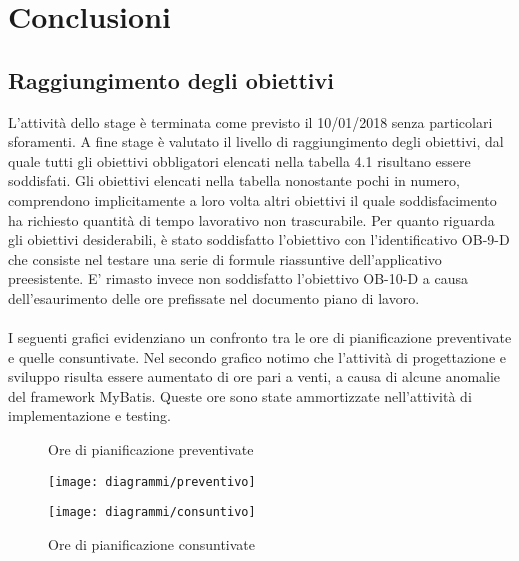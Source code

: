 
\chapter{Conclusioni}
\label{cap:conclusioni}




\section{Raggiungimento degli obiettivi}
L'attività dello stage è terminata come previsto il 10/01/2018 senza particolari sforamenti. 
A fine stage è valutato il livello di raggiungimento degli obiettivi, dal quale tutti gli obiettivi obbligatori elencati nella tabella
4.1 risultano essere soddisfati. Gli obiettivi elencati nella tabella nonostante pochi in numero, comprendono implicitamente a loro volta altri obiettivi il quale soddisfacimento ha richiesto quantità di tempo lavorativo non trascurabile. Per quanto riguarda gli obiettivi desiderabili, è stato soddisfatto l'obiettivo con l'identificativo OB-9-D che consiste nel testare una serie di formule riassuntive dell'applicativo preesistente. E' rimasto invece non soddisfatto l'obiettivo OB-10-D a causa
 dell'esaurimento delle ore prefissate nel documento piano di lavoro.\\\\
 I seguenti grafici evidenziano un confronto tra le ore di pianificazione preventivate e quelle consuntivate. Nel secondo grafico notimo che l'attività di progettazione e sviluppo risulta essere aumentato di ore pari a venti, a causa di alcune anomalie del framework MyBatis. Queste ore sono state ammortizzate nell'attività di implementazione e testing. 
\clearpage
\begin{figure}[h]
   \begin{center}
       \caption{Ore di pianificazione preventivate}
     \texttt{[image: diagrammi/preventivo]} 

    \end{center}



   \begin{center}
     \texttt{[image: diagrammi/consuntivo]} 
    \caption{Ore di pianificazione consuntivate}
    \end{center}
\end{figure}

